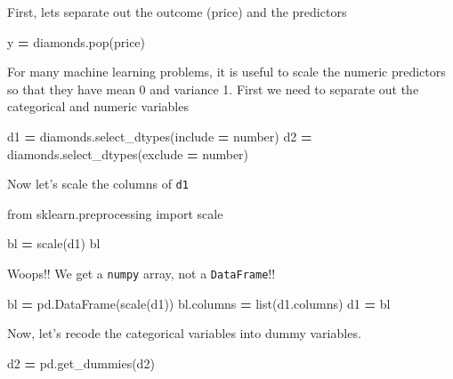 \documentclass[
  letterpaper,
]{scrbook}
\newenvironment{Shaded}{\begin{snugshade}}{\end{snugshade}}
\newcommand{\BuiltInTok}[1]{#1}
\newcommand{\ImportTok}[1]{#1}
\newcommand{\NormalTok}[1]{#1}
\newcommand{\OperatorTok}[1]{\textcolor[rgb]{0.81,0.36,0.00}{\textbf{#1}}}
\newcommand{\StringTok}[1]{\textcolor[rgb]{0.31,0.60,0.02}{#1}}
\begin{document}
First, lets separate out the outcome (price) and the predictors

\begin{Shaded}
\begin{Highlighting}[]
\NormalTok{y }\OperatorTok{=}\NormalTok{ diamonds.pop(}\StringTok{\textquotesingle{}price\textquotesingle{}}\NormalTok{)}
\end{Highlighting}
\end{Shaded}

For many machine learning problems, it is useful to scale the numeric predictors so that they have mean 0 and
variance 1. First we need to separate out the categorical and numeric variables

\begin{Shaded}
\begin{Highlighting}[]
\NormalTok{d1 }\OperatorTok{=}\NormalTok{ diamonds.select\_dtypes(include }\OperatorTok{=} \StringTok{\textquotesingle{}number\textquotesingle{}}\NormalTok{)}
\NormalTok{d2 }\OperatorTok{=}\NormalTok{ diamonds.select\_dtypes(exclude }\OperatorTok{=} \StringTok{\textquotesingle{}number\textquotesingle{}}\NormalTok{)}
\end{Highlighting}
\end{Shaded}

Now let's scale the columns of \texttt{d1}

\begin{Shaded}
\begin{Highlighting}[]
\ImportTok{from}\NormalTok{ sklearn.preprocessing }\ImportTok{import}\NormalTok{ scale}

\NormalTok{bl }\OperatorTok{=}\NormalTok{ scale(d1)}
\NormalTok{bl}
\end{Highlighting}
\end{Shaded}

Woops!! We get a \texttt{numpy} array, not a \texttt{DataFrame}!!

\begin{Shaded}
\begin{Highlighting}[]
\NormalTok{bl }\OperatorTok{=}\NormalTok{ pd.DataFrame(scale(d1))}
\NormalTok{bl.columns }\OperatorTok{=} \BuiltInTok{list}\NormalTok{(d1.columns)}
\NormalTok{d1 }\OperatorTok{=}\NormalTok{ bl}
\end{Highlighting}
\end{Shaded}

Now, let's recode the categorical variables into dummy variables.

\begin{Shaded}
\begin{Highlighting}[]
\NormalTok{d2 }\OperatorTok{=}\NormalTok{ pd.get\_dummies(d2)}
\end{Highlighting}
\end{Shaded}
\end{document}
